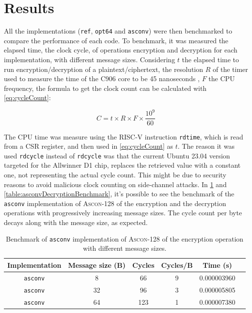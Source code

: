 \documentclass[11pt,twoside]{article}
\begin{document}
\section{Results}
\label{section:results}

All the implementations (\texttt{ref}, \texttt{opt64} and \texttt{asconv}) were then benchmarked to compare the performance of each code. To benchmark, it was measured the elapsed time, the clock cycle, of operations encryption and decryption for each implementation, with different message sizes. Considering $t$ the elapsed time to run encryption/decryption of a plaintext/ciphertext, the resolution $R$ of the timer used to measure the time of the C906 core to be 45 nanoseconds  \cite{10179399}, $F$ the CPU frequency, the formula to get the clock count can be calculated with \cref{eq:cycleCount}:

\begin{equation}
  C = t \times R \times F \times \frac{10^{9}}{60} \label{eq:cycleCount}
\end{equation}

The CPU time was measure using the RISC-V instruction \texttt{rdtime}, which is read from a CSR register, and then used in \cref{eq:cycleCount} as $t$. The reason it was used \texttt{rdcycle} instead of \texttt{rdcycle} was that the current Ubuntu 23.04 version targeted for the Allwinner D1 chip, replaces the retrieved value with a constant one, not representing the actual cycle count. This might be due to security reasons to avoid malicious clock counting on side-channel attacks. In \cref{table:asconvEncryptionBenchmark} and \cref{table:asconvDecryptionBenchmark}, it's possible to see the benchmark of the \texttt{asconv} implementation of \textsc{Ascon-128} of the encryption and the decryption operations with progressively increasing message sizes. The cycle count per byte decays along with the message size, as expected.

\begin{table}[h]
  \centering
  \begin{tabular}{|c|c|c|c|c|c|}
    \hline
    \textbf{Implementation} & \textbf{Message size (B)} &
    \textbf{Cycles}         & \textbf{Cycles/B}         & \textbf{Time (s)}                   \\ \hline

    \texttt{asconv}         & 8                         & 66                & 9 & 0.000003960 \\ \hline

    \texttt{asconv}         & 32                        & 96                & 3 & 0.000005805 \\ \hline

    \texttt{asconv}         & 64                        & 123               & 1 & 0.000007380 \\ \hline
  \end{tabular}
  \caption{Benchmark of \texttt{asconv} implementation of \textsc{Ascon-128} of the encryption operation with different message sizes.}
  \label{table:asconvEncryptionBenchmark}
\end{table}
\end{document}
